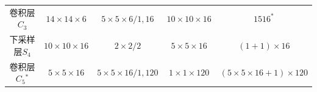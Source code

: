 \documentclass[12pt,a4paper,UTF8,twoside]{book}
\begin{document}
\begin{longtable}[]{@{}ccccc@{}}
\begin{minipage}[t]{0.12\columnwidth}\centering
卷积层\(C_3\)\strut
\end{minipage} & \begin{minipage}[t]{0.16\columnwidth}\centering
\(14\times14\times6\)\strut
\end{minipage} & \begin{minipage}[t]{0.19\columnwidth}\centering
\(5\times5\times6/1,16\)\strut
\end{minipage} & \begin{minipage}[t]{0.16\columnwidth}\centering
\(10\times10\times16\)\strut
\end{minipage} & \begin{minipage}[t]{0.24\columnwidth}\centering
\(1516^*\)\strut
\end{minipage}\tabularnewline
\begin{minipage}[t]{0.12\columnwidth}\centering
下采样层\(S_4\)\strut
\end{minipage} & \begin{minipage}[t]{0.16\columnwidth}\centering
\(10\times10\times16\)\strut
\end{minipage} & \begin{minipage}[t]{0.19\columnwidth}\centering
\(2\times2/2\)\strut
\end{minipage} & \begin{minipage}[t]{0.16\columnwidth}\centering
\(5\times5\times16\)\strut
\end{minipage} & \begin{minipage}[t]{0.24\columnwidth}\centering
\((1+1)\times16\)\strut
\end{minipage}\tabularnewline
\begin{minipage}[t]{0.12\columnwidth}\centering
卷积层\(C_5\)\(^*\)\strut
\end{minipage} & \begin{minipage}[t]{0.16\columnwidth}\centering
\(5\times5\times16\)\strut
\end{minipage} & \begin{minipage}[t]{0.19\columnwidth}\centering
\(5\times5\times16/1,120\)\strut
\end{minipage} & \begin{minipage}[t]{0.16\columnwidth}\centering
\(1\times1\times120\)\strut
\end{minipage} & \begin{minipage}[t]{0.24\columnwidth}\centering
\((5\times5\times16+1)\times120\)\strut
\end{minipage}\tabularnewline

\end{longtable}
\end{document}
